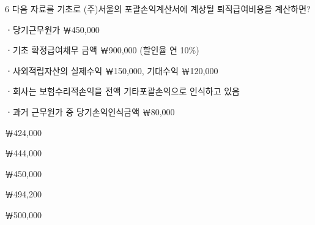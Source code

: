 \begin{question}{6}
다음 자료를 기초로 (주)서울의 포괄손익계산서에 계상될 퇴직급여비용을 계산하면?
\begin{framedtext}
ㆍ당기근무원가 ￦450,000 \par
ㆍ기초 확정급여채무 금액 ￦900,000 (할인율 연 10\%) \par
ㆍ사외적립자산의 실제수익 ￦150,000, 기대수익 ￦120,000 \par
ㆍ회사는 보험수리적손익을 전액 기타포괄손익으로 인식하고 있음 \par
ㆍ과거 근무원가 중 당기손익인식금액 ￦80,000 \par
\end{framedtext}
\begin{choices}
  \item ￦424,000
  \item ￦444,000
  \item ￦450,000
  \item ￦494,200
  \item ￦500,000
\end{choices}
\end{question}
